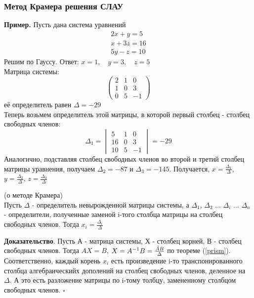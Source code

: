 \subsubsection{Метод Крамера решения СЛАУ}
\textbf{Пример.} Пусть дана система уравнений $$\begin{matrix}
2x+y=5\\x+3z=16\\5y-z=10\end{matrix}$$
Решим по Гауссу. Ответ: $x=1,\quad y=3,\quad z=5$\\
Матрица системы: $$\begin{pmatrix}
2&1&0\\1&0&3\\0&5&-1
\end{pmatrix}$$ её определитель равен $\Delta=-29$\\
Теперь возьмем определитель этой матрицы, в которой первый столбец - столбец
свободных членов: $$\Delta_1=\begin{vmatrix}5&1&0\\16&0&3\\10&5&-1
\end{vmatrix}=-29$$ 
Аналогично, подставляя столбец свободных членов во второй и третий столбец 
матрицы уравнения, получаем $\Delta_2=-87$ и $\Delta_3=-145$.
Получается, $x=\frac{\Delta_1}{\Delta}$, $y=\frac{\Delta_2}{\Delta}$,
$z=\frac{\Delta_3}{\Delta}$
\begin{theor} (о методе Крамера)\\
Пусть $\Delta$ - определитель невырожденной матрицы системы, а $\Delta_1$,
$\Delta_2$ ... $\Delta_i$ ... $\Delta_n$ - определители, полученные заменой 
i-того столбца матрицы на столбец свободных членов.
Тогда $x_i=\frac{\Delta_i}{\Delta}$ 
\end{theor}
\textbf{Доказательство}. Пусть А - матрица системы, Х - столбец корней, В -
столбец свободных членов. Тогда $AX=B$, $X=A^{-1}B=\frac{\Tilde{A}B}{\Delta}$
по теореме (\ref{prism}). Соответственно, каждый корень $x_i$ есть 
произведение i-то транспонированного столбца алгебраическийх дополений на 
столбец свободных членов, деленное на $\Delta$. А это есть разложение матрицы
по i-тому толбцу, замененному столбцом свободных членов. $\square$
